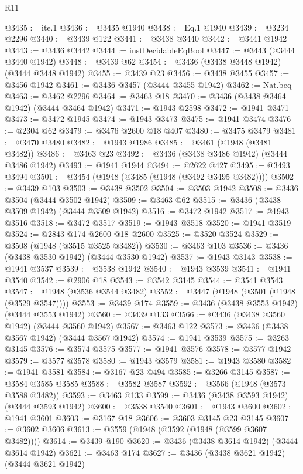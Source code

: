 \begin{lexlean}{R11}
\begin{coremodule}
@3435 := ite.{1}
@3436 := @3435 @1940
@3438 := Eq.{1} @1940
@3439 := @3234 @2296
@3440 := @3439 @122
@3441 := @3438 @3440
@3442 := @3441 @1942
@3443 := @3436 @3442
@3444 := instDecidableEqBool
@3447 := @3443 (@3444 @3440 @1942)
@3448 := @3439 @62
@3454 := @3436 (@3438 @3448 @1942) (@3444 @3448 @1942)
@3455 := @3439 @23
@3456 := @3438 @3455
@3457 := @3456 @1942
@3461 := @3436 @3457 (@3444 @3455 @1942)
@3462 := Nat.beq
@3463 := @3462 @2296
@3464 := @3463 @18
@3470 := @3436 (@3438 @3464 @1942) (@3444 @3464 @1942)
@3471 := @1943 @2598
@3472 := @1941 @3471
@3473 := @3472 @1945
@3474 := @1943 @3473
@3475 := @1941 @3474
@3476 := @2304 @62
@3479 := @3476 @2600 @18 @407
@3480 := @3475 @3479
@3481 := @3470 @3480
@3482 := @1943 @1986
@3485 := @3461 (@1948 (@3481 @3482))
@3486 := @3463 @23
@3492 := @3436 (@3438 @3486 @1942) (@3444 @3486 @1942)
@3493 := @1941 @1944
@3494 := @2622 @427
@3495 := @3493 @3494
@3501 := @3454 (@1948 (@3485 (@1948 (@3492 @3495 @3482))))
@3502 := @3439 @103
@3503 := @3438 @3502
@3504 := @3503 @1942
@3508 := @3436 @3504 (@3444 @3502 @1942)
@3509 := @3463 @62
@3515 := @3436 (@3438 @3509 @1942) (@3444 @3509 @1942)
@3516 := @3472 @1942
@3517 := @1943 @3516
@3518 := @3472 @3517
@3519 := @1943 @3518
@3520 := @1941 @3519
@3524 := @2843 @174 @2600 @18 @2600
@3525 := @3520 @3524
@3529 := @3508 (@1948 (@3515 @3525 @3482))
@3530 := @3463 @103
@3536 := @3436 (@3438 @3530 @1942) (@3444 @3530 @1942)
@3537 := @1943 @3143
@3538 := @1941 @3537
@3539 := @3538 @1942
@3540 := @1943 @3539
@3541 := @1941 @3540
@3542 := @2906 @18
@3543 := @3542 @3145
@3544 := @3541 @3543
@3547 := @1948 (@3536 @3544 @3482)
@3552 := @3447 (@1948 (@3501 (@1948 (@3529 @3547))))
@3553 := @3439 @174
@3559 := @3436 (@3438 @3553 @1942) (@3444 @3553 @1942)
@3560 := @3439 @133
@3566 := @3436 (@3438 @3560 @1942) (@3444 @3560 @1942)
@3567 := @3463 @122
@3573 := @3436 (@3438 @3567 @1942) (@3444 @3567 @1942)
@3574 := @1941 @3539
@3575 := @3263 @3145
@3576 := @3574 @3575
@3577 := @1941 @3576
@3578 := @3577 @1942
@3579 := @3577 @3578
@3580 := @1943 @3579
@3581 := @1943 @3580
@3582 := @1941 @3581
@3584 := @3167 @23 @494
@3585 := @3266 @3145
@3587 := @3584 @3585 @3585
@3588 := @3582 @3587
@3592 := @3566 (@1948 (@3573 @3588 @3482))
@3593 := @3463 @133
@3599 := @3436 (@3438 @3593 @1942) (@3444 @3593 @1942)
@3600 := @3538 @3540
@3601 := @1943 @3600
@3602 := @1941 @3601
@3603 := @3167 @18
@3606 := @3603 @3145 @23 @3145
@3607 := @3602 @3606
@3613 := @3559 (@1948 (@3592 (@1948 (@3599 @3607 @3482))))
@3614 := @3439 @190
@3620 := @3436 (@3438 @3614 @1942) (@3444 @3614 @1942)
@3621 := @3463 @174
@3627 := @3436 (@3438 @3621 @1942) (@3444 @3621 @1942)

\end{coremodule}
\end{lexlean}
